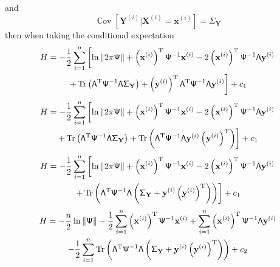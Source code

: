 \documentclass[12pt]{report}
\DeclareMathOperator{\cov}{\mathbb{C}ov}
\DeclareMathOperator{\trace}{Tr}
\newcommand{\T}{^\textup{T}}
\newcommand{\vect}[1]{\mathbf{#1}}
\newcommand{\matr}[1]{\mathsf{#1}}
\begin{document}
and
\begin{equation}
\cov\left[\vect{Y}^{(i)}|\vect{X}^{(i)}=\vect{x}^{(i)}\right] = \matr{\Sigma}_{\vect{Y}}
\end{equation}
then when taking the conditional expectation
\begin{multline*}
H = -\frac{1}{2}\sum_{i=1}^{n}\left[
\ln\|2\pi\matr{\Psi}\|+\left(\vect{x}^{(i)}\right)\T\matr{\Psi}^{-1}\vect{x}^{(i)}-2\left(\vect{x}^{(i)}\right)\T\matr{\Psi}^{-1}\matr{\Lambda}\vect{y}^{(i)}\right.\\
\left.+\trace\left(\matr{\Lambda}\T\matr{\Psi}^{-1}\matr{\Lambda}\matr{\Sigma}_{\vect{Y}}\right)+\left(\vect{y}^{(i)}\right)\T\matr{\Lambda}\T\matr{\Psi}^{-1}\matr{\Lambda}\vect{y}^{(i)}
\right]+c_1
\end{multline*}
\begin{multline*}
H = -\frac{1}{2}\sum_{i=1}^{n}\left[
\ln\|2\pi\matr{\Psi}\|+\left(\vect{x}^{(i)}\right)\T\matr{\Psi}^{-1}\vect{x}^{(i)}-2\left(\vect{x}^{(i)}\right)\T\matr{\Psi}^{-1}\matr{\Lambda}\vect{y}^{(i)}\right.\\
\left.+\trace\left(\matr{\Lambda}\T\matr{\Psi}^{-1}\matr{\Lambda}\matr{\Sigma}_{\vect{Y}}\right)+\trace\left(\matr{\Lambda}\T\matr{\Psi}^{-1}\matr{\Lambda}\vect{y}^{(i)}\left(\vect{y}^{(i)}\right)\T\right)
\right]+c_1
\end{multline*}
\begin{multline*}
H = -\frac{1}{2}\sum_{i=1}^{n}\left[
\ln\|2\pi\matr{\Psi}\|+\left(\vect{x}^{(i)}\right)\T\matr{\Psi}^{-1}\vect{x}^{(i)}-2\left(\vect{x}^{(i)}\right)\T\matr{\Psi}^{-1}\matr{\Lambda}\vect{y}^{(i)}\right.\\
\left.+\trace\left(\matr{\Lambda}\T\matr{\Psi}^{-1}\matr{\Lambda}\left(\matr{\Sigma}_{\vect{Y}}+\vect{y}^{(i)}\left(\vect{y}^{(i)}\right)\T\right)\right)
\right]+c_1
\end{multline*}
\begin{multline*}
H = -\frac{n}{2}
\ln\|\matr{\Psi}\|
-\frac{1}{2}\sum_{i=1}^{n}\left(\vect{x}^{(i)}\right)\T\matr{\Psi}^{-1}\vect{x}^{(i)}
+\sum_{i=1}^{n}\left(\vect{x}^{(i)}\right)\T\matr{\Psi}^{-1}\matr{\Lambda}\vect{y}^{(i)}\\
-\frac{1}{2}\sum_{i=1}^{n}\trace\left(\matr{\Lambda}\T\matr{\Psi}^{-1}\matr{\Lambda}\left(\matr{\Sigma}_{\vect{Y}}+\vect{y}^{(i)}\left(\vect{y}^{(i)}\right)\T\right)\right)
+c_2
\end{multline*}
\end{document}

